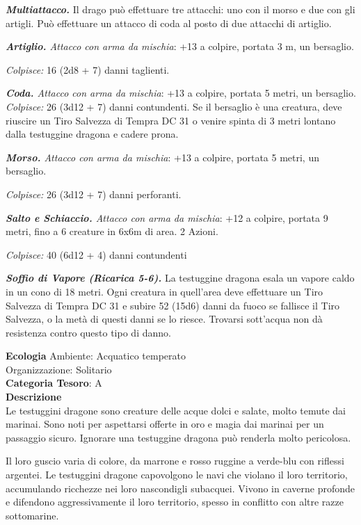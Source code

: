 \begin{multicols}{2}
{\emph{\textbf{Multiattacco.}} Il drago può effettuare tre attacchi: uno con il morso e due con gli artigli. Può effettuare un attacco di coda al posto di due attacchi di artiglio.

\emph{\textbf{Artiglio.} Attacco con arma da mischia}: +13 a colpire, portata 3 m, un bersaglio.

\emph{Colpisce:} 16 (2d8 + 7) danni taglienti.

\emph{\textbf{Coda.} Attacco con arma da mischia}: +13 a colpire, portata 5 metri, un bersaglio.
\emph{Colpisce:} 26 (3d12 + 7) danni contundenti. Se il bersaglio è una creatura, deve riuscire un Tiro Salvezza di Tempra DC 31 o venire spinta di 3 metri lontano dalla testuggine dragona e cadere prona.

\emph{\textbf{Morso.} Attacco con arma da mischia}: +13 a colpire, portata 5 metri, un bersaglio.

\emph{Colpisce:} 26 (3d12 + 7) danni perforanti.

\emph{\textbf{Salto e Schiaccio.} Attacco con arma da mischia}: +12 a colpire, portata 9 metri, fino a 6 creature in 6x6m di area. 2 Azioni.

\emph{Colpisce:} 40 (6d12 + 4) danni contundenti

\emph{\textbf{Soffio di Vapore (Ricarica 5-6).}} La testuggine dragona esala un vapore caldo in un cono di 18 metri. Ogni creatura in quell'area deve effettuare un Tiro Salvezza di Tempra DC 31 e subire 52 (15d6) danni da fuoco se fallisce il Tiro Salvezza, o la metà di questi danni se lo riesce. Trovarsi sott'acqua non dà resistenza contro questo tipo di danno.

\textbf{Ecologia}
Ambiente: Acquatico temperato\\
Organizzazione: Solitario\\
\textbf{Categoria Tesoro}: A\\
\textbf{Descrizione}\\
Le testuggini dragone sono creature delle acque dolci e salate, molto temute dai marinai. Sono noti per aspettarsi offerte in oro e magia dai marinai per un passaggio sicuro. Ignorare una testuggine dragona può renderla molto pericolosa.

Il loro guscio varia di colore, da marrone e rosso ruggine a verde-blu con riflessi argentei. Le testuggini dragone capovolgono le navi che violano il loro territorio, accumulando ricchezze nei loro nascondigli subacquei. Vivono in caverne profonde e difendono aggressivamente il loro territorio, spesso in conflitto con altre razze sottomarine.

}
\end{multicols}
